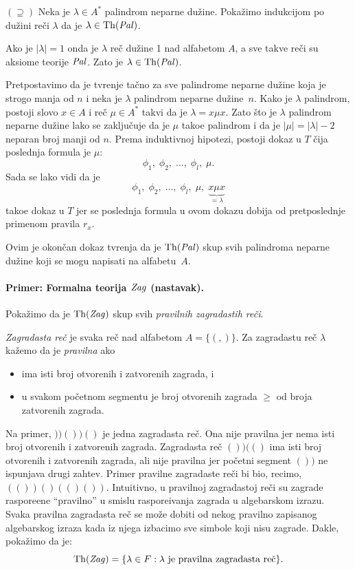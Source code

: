 \medskip

$(\supseteq)$ Neka je $\lambda \in A^*$ palindrom neparne du\v zine. Poka\v zimo indukcijom po du\v zini
re\v ci $\lambda$ da je $\lambda \in \mathrm{Th}(\mathit{Pal})$.

Ako je $|\lambda| = 1$ onda je $\lambda$ re\v c du\v zine 1 nad alfabetom $A$, a sve takve re\v ci su
aksiome teorije $\mathit{Pal}$. Zato je $\lambda \in \mathrm{Th}(\mathit{Pal})$.

Pretpostavimo da je tvr\dj enje ta\v cno za sve palindrome neparne du\v zine koja je strogo
manja od $n$ i neka je $\lambda$ palindrom neparne du\v zine~$n$. Kako je $\lambda$ palindrom,
postoji slovo $x \in A$ i re\v c $\mu \in A^*$ takvi da je $\lambda = x \mu x$. Zato \v sto je $\lambda$
palindrom neparne du\v zine lako se zaklju\v cuje da je $\mu$ tako\dj e palindrom i da je
$|\mu| = |\lambda| - 2$ neparan broj manji od $n$. Prema induktivnoj hipotezi, postoji dokaz
u $T$ \v cija poslednja formula je $\mu$:
$$
  \phi_1, \; \phi_2, \; \ldots, \; \phi_l, \; \mu.
$$
Sada se lako vidi da je
$$
  \phi_1, \; \phi_2, \; \ldots, \; \phi_l, \; \mu, \; \underbrace{x \mu x}_{= \lambda}
$$
tako\dj e dokaz u $T$ jer se poslednja formula u ovom dokazu dobija od pretposlednje primenom pravila $r_x$.

Ovim je okon\v can dokaz tvr\dj enja da je $\mathrm{Th}(\mathit{Pal})$ skup svih palindroma neparne du\v zine
koji se mogu napisati na alfabetu~$A$.

\paragraph{Primer: Formalna teorija $\mathit{Zag}$ (nastavak).}
Poka\v zimo da je $\mathrm{Th}(\mathit{Zag})$ skup svih \emph{pravilnih zagradastih re\v ci}.

\emph{Zagradasta re\v c} je svaka re\v c nad alfabetom $A = \{ (, ) \}$. Za zagradastu re\v c $\lambda$
ka\v zemo da je \emph{pravilna} ako
\begin{itemize}
\item
  ima isti broj otvorenih i zatvorenih zagrada, i
\item
  u svakom po\v cetnom segmentu je broj otvorenih zagrada $\ge$ od broja zatvorenih zagrada.
\end{itemize}
Na primer, $))())()$ je jedna zagradasta re\v c. Ona nije pravilna jer nema isti broj otvorenih i zatvorenih zagrada.
Zagradasta re\v c $())(()$ ima isti broj otvorenih i zatvorenih zagrada, ali nije pravilna jer po\v cetni segment
$())$ ne ispunjava drugi zahtev. Primer pravilne zagradaste re\v ci bi bio, recimo, $(())()(()())$. Intuitivno,
u pravilnoj zagradastoj re\v ci su zagrade raspore\dj ene ``pravilno'' u smislu raspore\dj ivanja zagrada u
algebarskom izrazu. Svaka pravilna zagradasta re\v c se mo\v ze dobiti od nekog pravilno zapisanog algebarskog izraza
kada iz njega izbacimo sve simbole koji nisu zagrade.
Dakle, poka\v zimo da je:
$$
  \Th(\Zag) = \{ \lambda \in F : \lambda \text{ je pravilna zagradasta re\v c} \}.
$$

